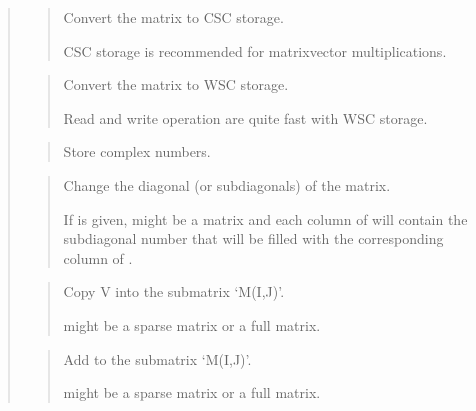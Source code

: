 \documentclass[a4paper,11pt,english]{sphinxmanual}
\begin{document}
\begin{quote}
\begin{quote}
\sphinxAtStartPar
Convert the matrix to CSC storage.

\sphinxAtStartPar
CSC storage is recommended for matrix\sphinxhyphen{}vector multiplications.
\end{quote}

\sphinxAtStartPar
{}
\begin{quote}

\sphinxAtStartPar
Convert the matrix to WSC storage.

\sphinxAtStartPar
Read and write operation are quite fast with WSC storage.
\end{quote}

\sphinxAtStartPar
{}
\begin{quote}

\sphinxAtStartPar
Store complex numbers.
\end{quote}

\sphinxAtStartPar
{}
\begin{quote}

\sphinxAtStartPar
Change the diagonal (or sub\sphinxhyphen{}diagonals) of the matrix.

\sphinxAtStartPar
If  is given,  might be a matrix and each column of  will
contain the sub\sphinxhyphen{}diagonal number that will be filled with the
corresponding column of .
\end{quote}

\sphinxAtStartPar
{}
\begin{quote}

\sphinxAtStartPar
Copy V into the sub\sphinxhyphen{}matrix ‘M(I,J)’.

\sphinxAtStartPar
{} might be a sparse matrix or a full matrix.
\end{quote}

\sphinxAtStartPar
{}
\begin{quote}

\sphinxAtStartPar
Add  to the sub\sphinxhyphen{}matrix ‘M(I,J)’.

\sphinxAtStartPar
{} might be a sparse matrix or a full matrix.
\end{quote}
\end{quote}
\end{document}
